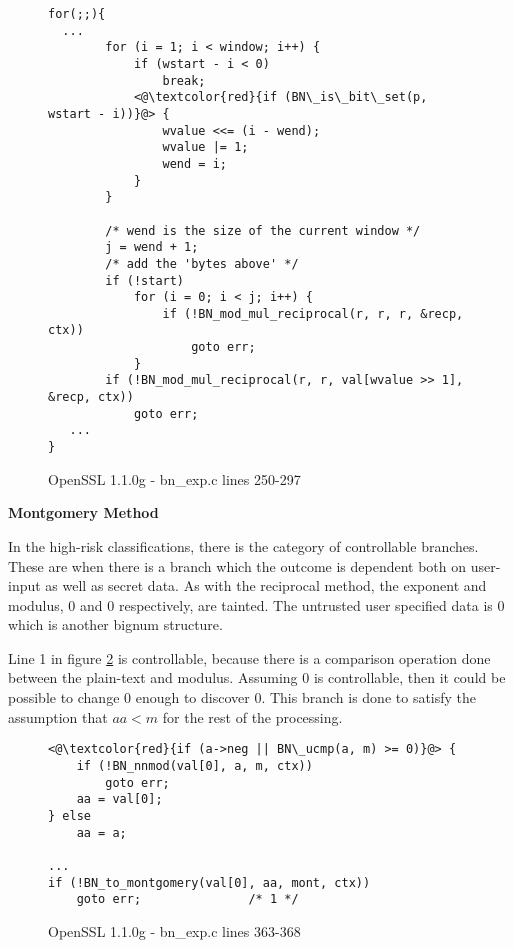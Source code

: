 \begin{figure}[h!tpb]
\begin{lstlisting}
for(;;){
  ...
        for (i = 1; i < window; i++) {
            if (wstart - i < 0)
                break;
            <@\textcolor{red}{if (BN\_is\_bit\_set(p, wstart - i))}@> {
                wvalue <<= (i - wend);
                wvalue |= 1;
                wend = i;
            }
        }

        /* wend is the size of the current window */
        j = wend + 1;
        /* add the 'bytes above' */
        if (!start)
            for (i = 0; i < j; i++) {
                if (!BN_mod_mul_reciprocal(r, r, r, &recp, ctx))
                    goto err;
            }
        if (!BN_mod_mul_reciprocal(r, r, val[wvalue >> 1], &recp, ctx))
            goto err;
   ...
}
\end{lstlisting}
\caption{OpenSSL 1.1.0g - bn\_exp.c lines 250-297}
\label{code:bn-recp-hi2}
\end{figure}

\noindent
\textbf{Montgomery Method}

   In the high-risk classifications, there is the category of controllable
   branches. These are when there is a branch which the outcome is dependent
   both on user-input as well as secret data. As with the reciprocal method, the
   exponent and modulus,  0 and  0 respectively, are tainted. The
   untrusted user specified data is  0 which is another bignum structure.

   Line 1 in figure \ref{code:mont-nonconst-compare} is controllable, because
   there is a comparison operation done between the plain-text and modulus.
   Assuming  0 is controllable, then it could be possible to change
    0 enough to discover  0. This branch is done to
   satisfy the assumption that $aa < m$ for the rest of the processing.


\begin{figure}[h!]
\begin{lstlisting}
<@\textcolor{red}{if (a->neg || BN\_ucmp(a, m) >= 0)}@> {
    if (!BN_nnmod(val[0], a, m, ctx))
        goto err;
    aa = val[0];
} else
    aa = a;

...
if (!BN_to_montgomery(val[0], aa, mont, ctx))
    goto err;               /* 1 */
\end{lstlisting}
\caption{OpenSSL 1.1.0g - bn\_exp.c lines 363-368}
\label{code:mont-nonconst-compare}
\end{figure}

